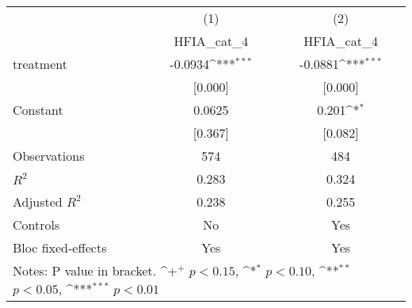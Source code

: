 {
\def\sym#1{\ifmmode^{#1}\else\(^{#1}\)\fi}
\begin{tabular*}{1.2\hsize}{@{\hskip\tabcolsep\extracolsep\fill}l*{2}{c}}
\cline{1-3}\cline{1-3}
     &\multicolumn{1}{c}{(1)}&\multicolumn{1}{c}{(2)}\\
     &\multicolumn{1}{c}{HFIA\_cat\_4}&\multicolumn{1}{c}{HFIA\_cat\_4}\\
\cline{1-3}
treatment&-0.0934\sym{***}&-0.0881\sym{***}\\
     &[0.000]         &[0.000]         \\
[1em]
Constant&0.0625         &0.201\sym{*}  \\
     &[0.367]         &[0.082]         \\
\cline{1-3}
Observations&574         &484         \\
\(R^{2}\)&0.283         &0.324         \\
Adjusted \(R^{2}\)&0.238         &0.255         \\
Controls&No         &Yes         \\
Bloc fixed-effects&Yes         &Yes         \\
\cline{1-3}\cline{1-3}
\multicolumn{3}{p{1.0\textwidth}}{\footnotesize Notes: P value in bracket. \sym{+} \(p<0.15\), \sym{*} \(p<0.10\), \sym{**} \(p<0.05\), \sym{***} \(p<0.01\)}\\
\end{tabular*}
}
